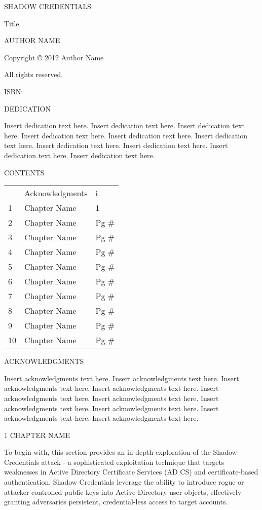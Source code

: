SHADOW CREDENTIALS

Title

AUTHOR NAME

Copyright © 2012 Author Name

All rights reserved.

ISBN:

DEDICATION

Insert dedication text here. Insert dedication text here. Insert dedication text here. Insert dedication text here. Insert dedication text here. Insert dedication text here. Insert dedication text here. Insert dedication text here. Insert dedication text here. Insert dedication text here.

CONTENTS

\begin{table}
\centering

\begin{tabular}{l l l}
 & Acknowledgments & i \\
1 & Chapter Name & 1 \\
2 & Chapter Name & Pg \# \\
3 & Chapter Name & Pg \# \\
4 & Chapter Name & Pg \# \\
5 & Chapter Name & Pg \# \\
6 & Chapter Name & Pg \# \\
7 & Chapter Name & Pg \# \\
8 & Chapter Name & Pg \# \\
9 & Chapter Name & Pg \# \\
10 & Chapter Name & Pg \# \\

\end{tabular}

\end{table}

ACKNOWLEDGMENTS

Insert acknowledgments text here. Insert acknowledgments text here. Insert acknowledgments text here. Insert acknowledgments text here. Insert acknowledgments text here. Insert acknowledgments text here. Insert acknowledgments text here. Insert acknowledgments text here. Insert acknowledgments text here. Insert acknowledgments text here.

1 CHAPTER NAME

To begin with, this section provides an in-depth exploration of the Shadow Credentials attack - a sophisticated exploitation technique that targets weaknesses in Active Directory Certificate Services (AD CS) and certificate-based authentication. Shadow Credentials leverage the ability to introduce rogue or attacker-controlled public keys into Active Directory user objects, effectively granting adversaries persistent, credential-less access to target accounts.

